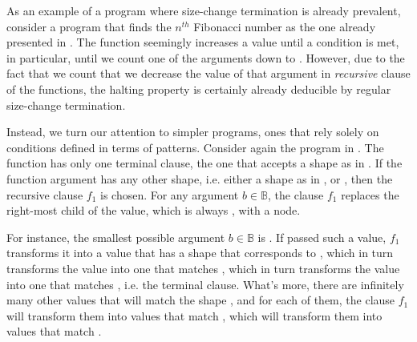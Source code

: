 As an example of a program where size-change termination is already prevalent,
consider a program that finds the $n^{th}$ Fibonacci number as the one already
presented in . The function 
seemingly increases a value until a condition is met, in particular, until we
count one of the arguments down to . However, due to the fact that we
count that we decrease the value of that argument in \emph{recursive} clause of
the  functions, the halting property is certainly already
deducible by regular size-change termination.

Instead, we turn our attention to simpler programs, ones that rely solely on
conditions defined in terms of patterns. Consider again the program in
. The function  has only one terminal
clause, the one that accepts a shape as in .
If the function argument has any other shape, i.e. either a shape as in
,  or
, then the recursive clause $f_1$ is
chosen. For any argument $b\in\mathbb{B}$, the clause $f_1$ replaces the
right-most child of the value, which is always , with a node.

For instance, the smallest possible argument $b\in\mathbb{B}$ is .  If
passed such a value, $f_1$ transforms it into a value that has a shape that
corresponds to , which in turn transforms
the value into one that matches , which in
turn transforms the value into one that matches
, i.e. the terminal clause. What's more,
there are infinitely many other values that will match the shape
, and for each of them, the clause $f_1$
will transform them into values that match
, which will transform them into values
that match .


